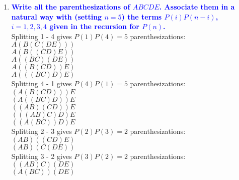 \documentclass[11pt]{article}
\begin{document}
\begin{enumerate}
    
\item \textbf{\textcolor{blue}{Write all the parenthesizations of $ABCDE$.
Associate them in a natural way with (setting $n=5$) the
terms $P(i)P(n-i)$, $i=1,2,3,4$ given in the recursion for $P(n)$.}}
    \\ Splitting 1 - 4 gives $P(1)P(4) = 5$ parenthesizations:
    \\ $A(B(C(DE)))$
    \\ $A(B((CD)E))$
    \\ $A((BC)(DE))$
    \\ $A((B(CD))E)$
    \\ $A(((BC)D)E)$
    \\ Splitting 4 - 1 gives $P(4)P(1) = 5$ parenthesizations:
    \\ $(A(B(CD)))E$
    \\ $(A((BC)D))E$
    \\ $((AB)(CD))E$
    \\ $(((AB)C)D)E$
    \\ $((A(BC))D)E$
    \\ Splitting 2 - 3 gives $P(2)P(3) = 2$ parenthesizations:
    \\ $(AB)((CD)E)$
    \\ $(AB)(C(DE))$
    \\ Splitting 3 - 2 gives $P(3)P(2) = 2$ parenthesizations:
    \\ $((AB)C)(DE)$
    \\ $(A(BC))(DE)$


\end{enumerate}
\end{document}
